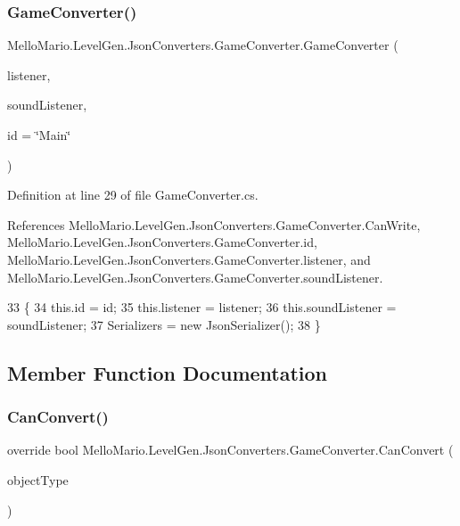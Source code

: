 \subsubsection{Game\+Converter()}
{\footnotesize\ttfamily Mello\+Mario.\+Level\+Gen.\+Json\+Converters.\+Game\+Converter.\+Game\+Converter (\begin{DoxyParamCaption}\item[{\textbf{ I\+Listener}$<$ \textbf{ I\+Game\+Object} $>$}]{listener,  }\item[{\textbf{ I\+Listener}$<$ \textbf{ I\+Soundable} $>$}]{sound\+Listener,  }\item[{string}]{id = {\ttfamily \char`\"{}Main\char`\"{}} }\end{DoxyParamCaption})}



Definition at line 29 of file Game\+Converter.\+cs.



References Mello\+Mario.\+Level\+Gen.\+Json\+Converters.\+Game\+Converter.\+Can\+Write, Mello\+Mario.\+Level\+Gen.\+Json\+Converters.\+Game\+Converter.\+id, Mello\+Mario.\+Level\+Gen.\+Json\+Converters.\+Game\+Converter.\+listener, and Mello\+Mario.\+Level\+Gen.\+Json\+Converters.\+Game\+Converter.\+sound\+Listener.


\begin{DoxyCode}
33         \{
34             this.\textcolor{keywordtype}{id} = id;
35             this.listener = listener;
36             this.soundListener = soundListener;
37             Serializers = \textcolor{keyword}{new} JsonSerializer();
38         \}
\end{DoxyCode}


\subsection{Member Function Documentation}
\mbox{\label{classMelloMario_1_1LevelGen_1_1JsonConverters_1_1GameConverter_adb2083cf21479bea251ce8d2aed0c466}} 
\subsubsection{Can\+Convert()}
{\footnotesize\ttfamily override bool Mello\+Mario.\+Level\+Gen.\+Json\+Converters.\+Game\+Converter.\+Can\+Convert (\begin{DoxyParamCaption}\item[{Type}]{object\+Type }\end{DoxyParamCaption})}



